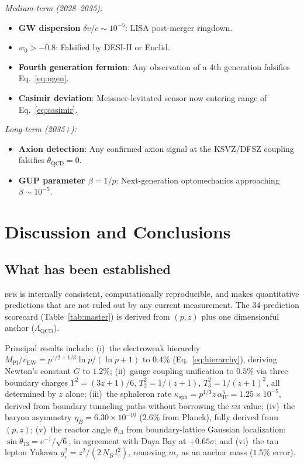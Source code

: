 \documentclass[aps,prd,twocolumn,superscriptaddress,longbibliography,nofootinbib]{revtex4-2}
\newcommand{\vEW}{v_{\mathrm{EW}}}
\newcommand{\MPl}{M_{\mathrm{Pl}}}
\newcommand{\bpr}{\textsc{bpr}}
\newcommand{\SM}{\textsc{sm}}
\begin{document}
\textit{Medium-term (2028--2035):}
\begin{itemize}
\item \textbf{GW dispersion} $\delta v/c \sim 10^{-5}$: LISA post-merger
  ringdown.
\item \textbf{$w_0 > -0.8$}: Falsified by DESI-II or Euclid.
\item \textbf{Fourth generation fermion}: Any observation of a 4th
  generation falsifies Eq.~\eqref{eq:ngen}.
\item \textbf{Casimir deviation}: Meissner-levitated sensor now entering
  range of Eq.~\eqref{eq:casimir}.
\end{itemize}

\textit{Long-term (2035+):}
\begin{itemize}
\item \textbf{Axion detection}: Any confirmed axion signal at the
  KSVZ/DFSZ coupling falsifies $\theta_{\mathrm{QCD}} = 0$.
\item \textbf{GUP parameter $\beta = 1/p$}: Next-generation
  optomechanics approaching $\beta \sim 10^{-5}$.
\end{itemize}


\section{Discussion and Conclusions}
\label{sec:discussion}

\subsection{What has been established}

\bpr{} is internally consistent, computationally reproducible, and makes
quantitative predictions that are not ruled out by any current measurement.
The 34-prediction scorecard (Table~\ref{tab:master}) is derived from
$(p, z)$ plus one dimensionful anchor ($\Lambda_{\mathrm{QCD}}$).

Principal results include: (i)~the electroweak hierarchy
$\MPl/\vEW = p^{z/2+1/3}\ln p/(\ln p + 1)$ to $0.4\%$
(Eq.~\ref{eq:hierarchy}), deriving Newton's constant $G$ to $1.2\%$;
(ii)~gauge coupling unification to $0.5\%$ via three boundary charges
$Y^2 = (3z{+}1)/6$, $T_2^2 = 1/(z{+}1)$, $T_3^2 = 1/(z{+}1)^2$,
all determined by $z$ alone;
(iii)~the sphaleron rate $\kappa_{\mathrm{sph}} = p^{1/3} z\,\alpha_W^5
= 1.25\times10^{-5}$, derived from boundary tunneling paths without
borrowing the \SM{} value;
(iv)~the baryon asymmetry $\eta_B = 6.30\times10^{-10}$ ($2.6\%$ from
Planck), fully derived from $(p,z)$;
(v)~the reactor angle $\theta_{13}$ from boundary-lattice Gaussian
localization: $\sin\theta_{13} = e^{-1}/\!\sqrt{6}$, in agreement with
Daya Bay at $+0.65\sigma$;
and (vi)~the tau lepton Yukawa $y_\tau^2 = z^2/(2\,N_B\,l_\tau^2)$,
removing $m_\tau$ as an anchor mass ($1.5\%$ error).
\end{document}
